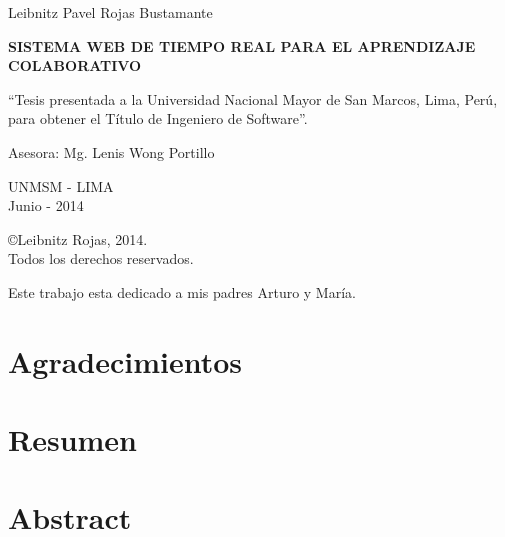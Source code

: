 \newpage
\begin{center}
    Leibnitz Pavel Rojas Bustamante
\end{center}
\vspace*{3cm}
\begin{Large}
\textbf{SISTEMA WEB DE TIEMPO REAL PARA EL APRENDIZAJE COLABORATIVO} \\
\end{Large}
\vspace*{5cm}
\begin{flushright}
    \begin{minipage}{.5\textwidth}
    ``Tesis presentada a la Universidad Nacional Mayor de San Marcos, Lima, Perú, para obtener el Título de Ingeniero de Software''.
    \end{minipage}
    \end{flushright}
\vspace*{3cm}
\begin{flushright}
    \begin{minipage}{.5\textwidth}
    Asesora: Mg. Lenis Wong Portillo
    \end{minipage}
\end{flushright}
\vspace*{3cm}
\begin{center}
    UNMSM - LIMA\\
    Junio - 2014
\end{center}

\newpage
\vspace*{\fill}
\begin{center}
\copyright \hspace{0.2cm}Leibnitz Rojas, 2014.\\
Todos los derechos reservados.
\end{center}

\newpage
\clearpage
\vspace*{\fill}
\begin{flushright}
\begin{minipage}{.5\textwidth}
Este trabajo esta dedicado a mis padres Arturo y María.\\
\end{minipage}
\end{flushright}
\vfill %
\newpage
\chapter*{Agradecimientos}
\chapter*{Resumen}
\chapter*{Abstract}

